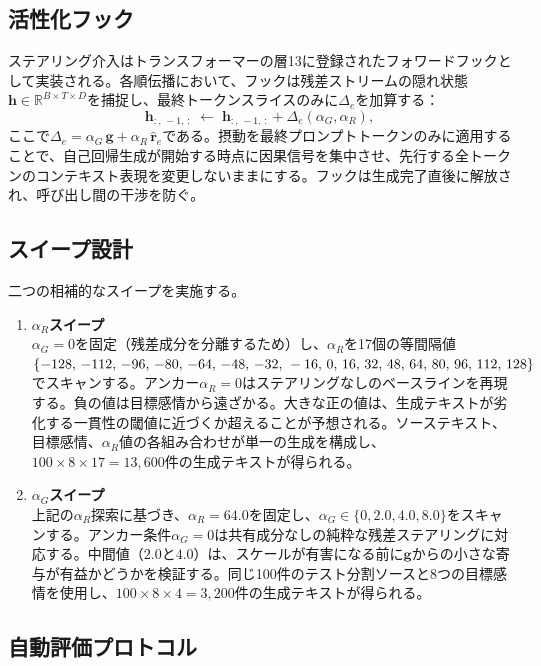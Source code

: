\subsection{活性化フック}
\label{subsec:activation_hook}
ステアリング介入はトランスフォーマーの層13に登録されたフォワードフックとして実装される。各順伝播において、フックは残差ストリームの隠れ状態$\mathbf{h} \in \mathbb{R}^{B \times T \times D}$を捕捉し、最終トークンスライスのみに$\Delta_e$を加算する：
\[
\mathbf{h}_{:,\,-1,\,:} \;\leftarrow\; \mathbf{h}_{:,\,-1,\,:} + \Delta_e(\alpha_G, \alpha_R),
\]
ここで$\Delta_e = \alpha_G\,\mathbf{g} + \alpha_R\,\hat{\mathbf{r}}_e$である。摂動を最終プロンプトトークンのみに適用することで、自己回帰生成が開始する時点に因果信号を集中させ、先行する全トークンのコンテキスト表現を変更しないままにする。フックは生成完了直後に解放され、呼び出し間の干渉を防ぐ。

\subsection{スイープ設計}

二つの相補的なスイープを実施する。

\begin{enumerate}
  \item \textbf{$\alpha_R$スイープ} \\
  $\alpha_G = 0$を固定（残差成分を分離するため）し、$\alpha_R$を17個の等間隔値$\{-128,\,-112,\,-96,\,-80,\,-64,\,-48,\,-32,\\\,-16,\,0,\,16,\,32,\,48,\,64,\,80,\,96,\,112,\,128\}$でスキャンする。アンカー$\alpha_R = 0$はステアリングなしのベースラインを再現する。負の値は目標感情から遠ざかる。大きな正の値は、生成テキストが劣化する一貫性の閾値に近づくか超えることが予想される。ソーステキスト、目標感情、$\alpha_R$値の各組み合わせが単一の生成を構成し、$100 \times 8 \times 17 = 13{,}600$件の生成テキストが得られる。
  \item \textbf{$\alpha_G$スイープ} \\
  上記の$\alpha_R$探索に基づき、$\alpha_R = 64.0$を固定し、$\alpha_G \in \{0, 2.0, 4.0, 8.0\}$をスキャンする。アンカー条件$\alpha_G = 0$は共有成分なしの純粋な残差ステアリングに対応する。中間値（$2.0$と$4.0$）は、スケールが有害になる前に$\mathbf{g}$からの小さな寄与が有益かどうかを検証する。同じ100件のテスト分割ソースと8つの目標感情を使用し、$100 \times 8 \times 4 = 3{,}200$件の生成テキストが得られる。
\end{enumerate}

\subsection{自動評価プロトコル}

